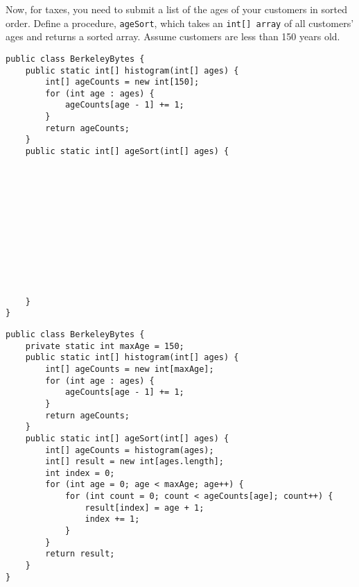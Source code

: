 \begin{blocksection}
\question Now, for taxes, you need to submit a list of the ages of your
customers in sorted order. Define a procedure, \lstinline$ageSort$, which takes
an \lstinline$int[] array$ of all customers' ages and returns a sorted
array. Assume customers are less than 150 years old.

\ifprintanswers
\else
\begin{lstlisting}
public class BerkeleyBytes {
    public static int[] histogram(int[] ages) {
        int[] ageCounts = new int[150];
        for (int age : ages) {
            ageCounts[age - 1] += 1;
        }
        return ageCounts;
    }
    public static int[] ageSort(int[] ages) {












    }
}
\end{lstlisting}
\fi

\begin{solution}
\begin{lstlisting}
public class BerkeleyBytes {
    private static int maxAge = 150;
    public static int[] histogram(int[] ages) {
        int[] ageCounts = new int[maxAge];
        for (int age : ages) {
            ageCounts[age - 1] += 1;
        }
        return ageCounts;
    }
    public static int[] ageSort(int[] ages) {
        int[] ageCounts = histogram(ages);
        int[] result = new int[ages.length];
        int index = 0;
        for (int age = 0; age < maxAge; age++) {
            for (int count = 0; count < ageCounts[age]; count++) {
                result[index] = age + 1;
                index += 1;
            }
        }
        return result;
    }
}
\end{lstlisting}
\end{solution}
\end{blocksection}
